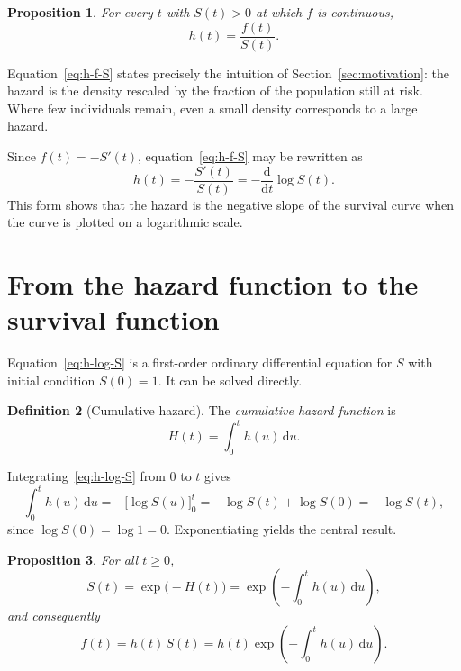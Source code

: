 \documentclass[11pt]{article}
\theoremstyle{definition}
\newtheorem{definition}{Definition}[section]
\theoremstyle{plain}
\newtheorem{proposition}[definition]{Proposition}
\newcommand{\dd}{\,\mathrm{d}}
\begin{document}
\begin{proposition}\label{prop:h-f-S}
For every $t$ with $S(t) > 0$ at which $f$ is continuous,
\begin{equation}\label{eq:h-f-S}
  h(t) = \frac{f(t)}{S(t)}.
\end{equation}
\end{proposition}

Equation~\eqref{eq:h-f-S} states precisely the intuition of Section~\ref{sec:motivation}: the hazard is the density rescaled by the fraction of the population still at risk. Where few individuals remain, even a small density corresponds to a large hazard.

Since $f(t) = -S'(t)$, equation~\eqref{eq:h-f-S} may be rewritten as
\begin{equation}\label{eq:h-log-S}
  h(t) = -\frac{S'(t)}{S(t)} = -\frac{\mathrm{d}}{\mathrm{d}t} \log S(t).
\end{equation}
This form shows that the hazard is the negative slope of the survival curve when the curve is plotted on a logarithmic scale.

\section{From the hazard function to the survival function}\label{sec:h-to-s}

Equation~\eqref{eq:h-log-S} is a first-order ordinary differential equation for $S$ with initial condition $S(0) = 1$. It can be solved directly.

\begin{definition}[Cumulative hazard]
The \emph{cumulative hazard function} is
\[
  H(t) = \int_0^t h(u) \dd u.
\]
\end{definition}

Integrating~\eqref{eq:h-log-S} from $0$ to $t$ gives
\[
  \int_0^t h(u) \dd u = -\bigl[\log S(u)\bigr]_0^t
  = -\log S(t) + \log S(0) = -\log S(t),
\]
since $\log S(0) = \log 1 = 0$. Exponentiating yields the central result.

\begin{proposition}\label{prop:S-exp-H}
For all $t \ge 0$,
\begin{equation}\label{eq:S-exp-H}
  S(t) = \exp\bigl(-H(t)\bigr) = \exp\!\left(-\int_0^t h(u) \dd u\right),
\end{equation}
and consequently
\begin{equation}\label{eq:f-h}
  f(t) = h(t)\,S(t) = h(t) \exp\!\left(-\int_0^t h(u) \dd u\right).
\end{equation}
\end{proposition}
\end{document}
